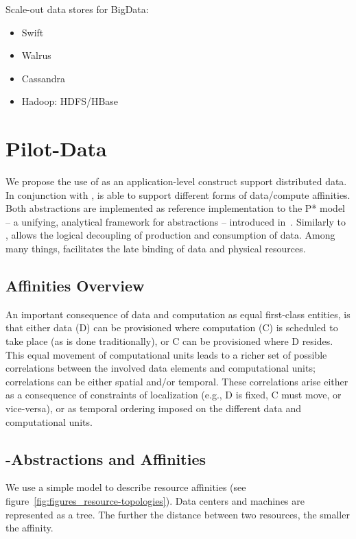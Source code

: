 \documentclass[conference]{IEEEtran}
\begin{document}
Scale-out data stores for BigData:
\begin{itemize}
	\item Swift
	\item Walrus
	\item Cassandra
	\item Hadoop: HDFS/HBase
\end{itemize}



\section{Pilot-Data}

We propose the use of \pilotdata as an application-level construct support
distributed data. In conjunction with \pilotjob, \pilotdata is able to support
different forms of data/compute affinities. Both abstractions are implemented
as reference implementation to the P* model -- a unifying, analytical
framework for \pilot abstractions -- introduced in~\cite{pstar11}. 
Similarly to \pilotjobs, \pilotdata allows the logical decoupling
of production and consumption of data. Among many things, \pilotdata 
facilitates the late binding of data and physical resources.  

\subsection{Affinities Overview}

An important consequence of data and computation as equal first-class
entities, is that either data (D) can be provisioned where computation
(C) is scheduled to take place (as is done traditionally), or C can be
provisioned where D resides. This equal movement of computational
units leads to a richer set of possible correlations between the
involved data elements and computational units; correlations can be
either spatial and/or temporal. These correlations arise either as a
consequence of constraints of localization (e.g., D is fixed, C must
move, or vice-versa), or as temporal ordering imposed on the different
data and computational units.


\subsection{\pilot-Abstractions and Affinities}


We use a simple model to describe resource affinities (see
figure~\ref{fig:figures_resource-topologies}). Data centers and machines are
represented as a tree. The further the distance between two resources, the
smaller the affinity.
\end{document}
